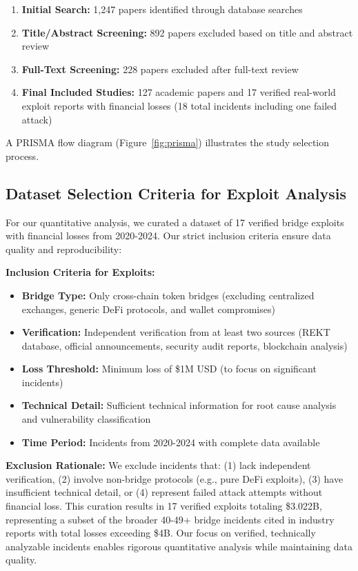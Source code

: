 \documentclass[runningheads]{llncs}
\begin{document}
\begin{enumerate}
    \item \textbf{Initial Search:} 1,247 papers identified through database searches
    \item \textbf{Title/Abstract Screening:} 892 papers excluded based on title and abstract review
    \item \textbf{Full-Text Screening:} 228 papers excluded after full-text review
    \item \textbf{Final Included Studies:} 127 academic papers and 17 verified real-world exploit reports with financial losses (18 total incidents including one failed attack)
\end{enumerate}

A PRISMA flow diagram (Figure~\ref{fig:prisma}) illustrates the study selection process.

\subsection{Dataset Selection Criteria for Exploit Analysis}
For our quantitative analysis, we curated a dataset of 17 verified bridge exploits with financial losses from 2020-2024. Our strict inclusion criteria ensure data quality and reproducibility:

\textbf{Inclusion Criteria for Exploits:}
\begin{itemize}
    \item \textbf{Bridge Type:} Only cross-chain token bridges (excluding centralized exchanges, generic DeFi protocols, and wallet compromises)
    \item \textbf{Verification:} Independent verification from at least two sources (REKT database, official announcements, security audit reports, blockchain analysis)
    \item \textbf{Loss Threshold:} Minimum loss of \$1M USD (to focus on significant incidents)
    \item \textbf{Technical Detail:} Sufficient technical information for root cause analysis and vulnerability classification
    \item \textbf{Time Period:} Incidents from 2020-2024 with complete data available
\end{itemize}

\textbf{Exclusion Rationale:}
We exclude incidents that: (1) lack independent verification, (2) involve non-bridge protocols (e.g., pure DeFi exploits), (3) have insufficient technical detail, or (4) represent failed attack attempts without financial loss. This curation results in 17 verified exploits totaling \$3.022B, representing a subset of the broader 40-49+ bridge incidents cited in industry reports with total losses exceeding \$4B. Our focus on verified, technically analyzable incidents enables rigorous quantitative analysis while maintaining data quality.
\end{document}
